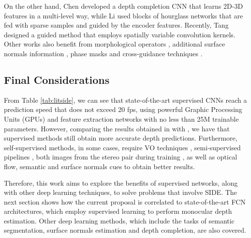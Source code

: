 \documentclass[5p]{elsarticle}
\begin{document}
On the other hand, Chen \etal \cite{chen2019learning} developed a depth completion CNN that learns 2D-3D features in a multi-level way, while Li \etal \cite{li2020multi} used blocks of hourglass networks that are fed with sparse samples and guided by the encoder features. Recently, Tang \etal \cite{tang2019learning} designed a guided method that employs spatially variable convolution kernels. Other works also benefit from morphological operators \cite{dimitrievski2018learning}, additional surface normals information \cite{qiu2019deeplidar,xu2019depth}, phase masks \cite{wu2019phasecam3d} and cross-guidance techniques \cite{lee2020deep}.

\subsection{Final Considerations}

From Table \ref{tab:litside}, we can see that state-of-the-art supervised CNNs reach a prediction speed that does not exceed 20 fps, using powerful Graphic Processing Units (GPUs) and feature extraction networks with no less than 25M trainable parameters. However, comparing the results obtained in \cite{casser2019depth,godard2019digging,liu2020mininet,poggi2020uncertainty} with \cite{fu2018deep,lee2019big,yin2019enforcing}, we have that supervised methods still obtain more accurate depth predictions. Furthermore, self-supervised methods, in some cases, require VO techniques \cite{wang2018learning,casser2019unsupervised,andraghetti2019enhancing}, semi-supervised pipelines \cite{kuznietsov2017semi,klodt2018supervising,tosi2019learning}, both images from the stereo pair during training \cite{garg2016unsupervised,pilzer2018unsupervised,gonzalezbello2020forget}, as well as optical flow, semantic and surface normals cues \cite{yang2018lego,zou2018df,ranjan2019competitive,guizilini2020semantically} to obtain better results.

Therefore, this work aims to explore the benefits of supervised networks, along with other deep learning techniques, to solve problems that involve SIDE. The next section shows how the current proposal is correlated to state-of-the-art FCN architectures, which employ supervised learning to perform monocular depth estimation. Other deep learning methods, which include the tasks of semantic segmentation, surface normals estimation and depth completion, are also covered.
\end{document}
